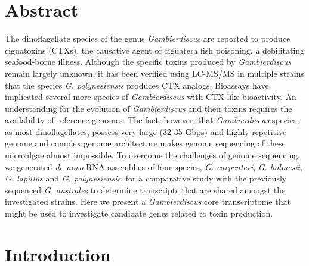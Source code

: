\documentclass[12pt]{article}
\begin{document}
\section{Abstract}
The dinoflagellate species of the genus \textit{Gambierdiscus} are reported to produce ciguatoxins (CTXs), the causative agent of ciguatera fish poisoning, a debilitating seafood-borne illness. 
Although the specific toxins produced by \textit{Gambierdiscus} remain largely unknown, it has been verified using LC-MS/MS in multiple strains that the species \textit{G. polynesiensis} produces CTX analogs. 
Bioassays have implicated several more species of \textit{Gambierdiscus} with CTX-like bioactivity. 
An understanding for the evolution of \textit{Gambierdiscus} and their toxins requires the availability of reference genomes. 
The fact, however, that \textit{Gambierdiscus} species, as most dinoflagellates, possess very large (32-35 Gbps) and highly repetitive genome and complex genome architecture makes genome sequencing of these microalgae almost impossible. 
To overcome the challenges of genome sequencing, we generated \textit{de novo} RNA assemblies of four species, \textit{G. carpenteri}, \textit{G. holmesii}, \textit{G. lapillus} and \textit{G. polynesiensis}, for a comparative study with the previously sequenced \textit{G. australes} to determine transcripts that are shared amongst the investigated strains. 
Here we present a \textit{Gambierdiscus} core transcriptome that might be used to investigate candidate genes related to toxin production.


\newpage
\section{Introduction}

\end{document}
